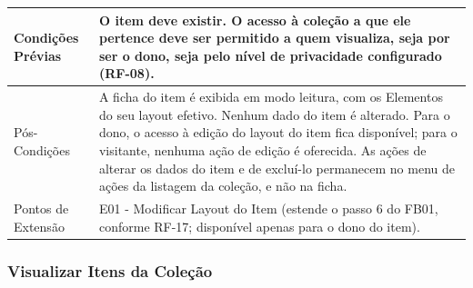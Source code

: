 \begin{longtable}{ >{\raggedright}p{2.8cm} | >{\raggedright\arraybackslash}p{10.7cm} }
Condições Prévias & O item deve existir. O acesso à coleção a que ele pertence deve ser permitido a quem visualiza, seja por ser o dono, seja pelo nível de privacidade configurado (RF-08). \\ \hline

Pós-Condições & A ficha do item é exibida em modo leitura, com os Elementos do seu layout efetivo. Nenhum dado do item é alterado. Para o dono, o acesso à edição do layout do item fica disponível; para o visitante, nenhuma ação de edição é oferecida. As ações de alterar os dados do item e de excluí-lo permanecem no menu de ações da listagem da coleção, e não na ficha. \\ \hline

Pontos de Extensão & E01 - Modificar Layout do Item (estende o passo 6 do FB01, conforme RF-17; disponível apenas para o dono do item). \\
\end{longtable}
\renewcommand{\arraystretch}{1}
\FloatBarrier


\subsubsection{Visualizar Itens da Coleção}

